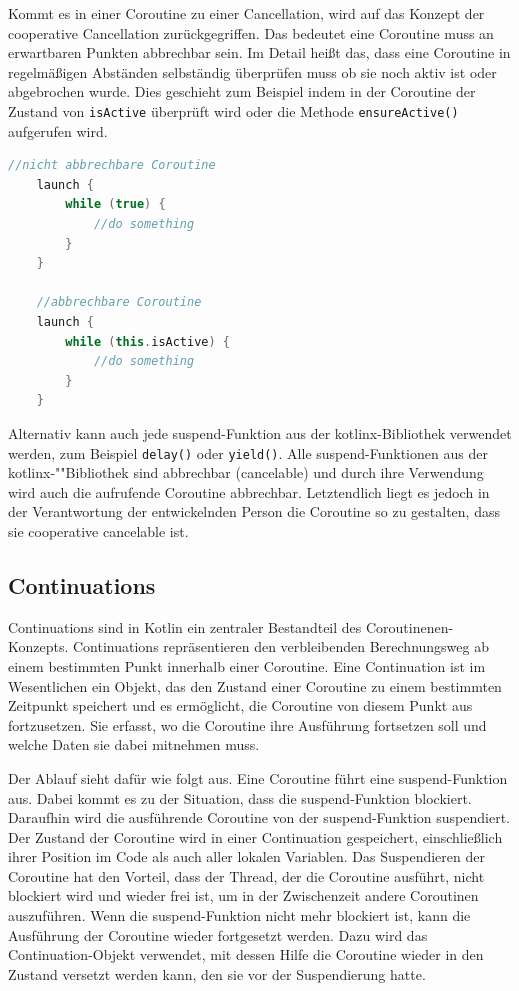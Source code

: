 \documentclass[fontsize=12pt,paper=a4,twoside=semi,parskip=half-,headsepline,headinclude]{scrreprt}
\begin{document}
Kommt es in einer Coroutine zu einer Cancellation, wird auf das Konzept der cooperative Cancellation\cite{Cancellation2024} zurückgegriffen. Das bedeutet eine Coroutine muss an erwartbaren Punkten abbrechbar sein. Im Detail heißt das, dass eine Coroutine in regelmäßigen Abständen selbständig überprüfen muss ob sie noch aktiv ist oder abgebrochen wurde. Dies geschieht zum Beispiel indem in der Coroutine der Zustand von \texttt{isActive} überprüft wird oder die Methode \texttt{ensureActive()} aufgerufen wird.

\begin{lstlisting}[language=Kotlin]
	//nicht abbrechbare Coroutine
	launch {
		while (true) {
			//do something
		}
	}

	//abbrechbare Coroutine
	launch {
		while (this.isActive) {
			//do something
		}
	}
\end{lstlisting}

Alternativ kann auch jede suspend-Funktion aus der kotlinx-Bibliothek verwendet werden, zum Beispiel \texttt{delay()} oder \texttt{yield()}. Alle suspend-Funktionen aus der kotlinx-""Bibliothek sind abbrechbar (cancelable) und  durch ihre Verwendung wird auch die aufrufende Coroutine abbrechbar. Letztendlich liegt es jedoch in der Verantwortung der entwickelnden Person die Coroutine so zu gestalten, dass sie cooperative cancelable ist.

\subsection{Continuations}

Continuations sind in Kotlin ein zentraler Bestandteil des Coroutinenen-Konzepts. Continuations repräsentieren den verbleibenden Berechnungsweg ab einem bestimmten Punkt innerhalb einer Coroutine. Eine Continuation ist im Wesentlichen ein Objekt, das den Zustand einer Coroutine zu einem bestimmten Zeitpunkt speichert und es ermöglicht, die Coroutine von diesem Punkt aus fortzusetzen. Sie erfasst, wo die Coroutine ihre Ausführung fortsetzen soll und welche Daten sie dabei mitnehmen muss.

Der Ablauf sieht dafür wie folgt aus. Eine Coroutine führt eine suspend-Funktion aus. Dabei kommt es zu der Situation, dass die suspend-Funktion blockiert. Daraufhin wird die ausführende Coroutine von der suspend-Funktion suspendiert. Der Zustand der Coroutine wird in einer Continuation gespeichert, einschließlich ihrer Position im Code als auch aller lokalen Variablen. Das Suspendieren der Coroutine hat den Vorteil, dass der Thread, der die Coroutine ausführt, nicht blockiert wird und wieder frei ist, um in der Zwischenzeit andere Coroutinen auszuführen. Wenn die suspend-Funktion nicht mehr blockiert ist, kann die Ausführung der Coroutine wieder fortgesetzt werden. Dazu wird das Continuation-Objekt verwendet, mit dessen Hilfe die Coroutine wieder in den Zustand versetzt werden kann, den sie vor der Suspendierung hatte.
\end{document}
